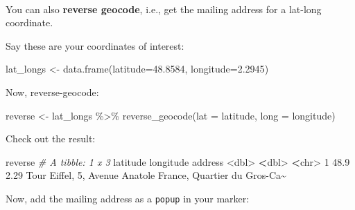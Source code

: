 \documentclass[
]{book}
\newenvironment{Shaded}{\begin{snugshade}}{\end{snugshade}}
\newcommand{\AttributeTok}[1]{\textcolor[rgb]{0.77,0.63,0.00}{#1}}
\newcommand{\CommentTok}[1]{\textcolor[rgb]{0.56,0.35,0.01}{\textit{#1}}}
\newcommand{\DecValTok}[1]{\textcolor[rgb]{0.00,0.00,0.81}{#1}}
\newcommand{\ErrorTok}[1]{\textcolor[rgb]{0.64,0.00,0.00}{\textbf{#1}}}
\newcommand{\FloatTok}[1]{\textcolor[rgb]{0.00,0.00,0.81}{#1}}
\newcommand{\FunctionTok}[1]{\textcolor[rgb]{0.00,0.00,0.00}{#1}}
\newcommand{\NormalTok}[1]{#1}
\newcommand{\OtherTok}[1]{\textcolor[rgb]{0.56,0.35,0.01}{#1}}
\newcommand{\SpecialCharTok}[1]{\textcolor[rgb]{0.00,0.00,0.00}{#1}}
\newcommand{\StringTok}[1]{\textcolor[rgb]{0.31,0.60,0.02}{#1}}
\begin{document}
~

You can also \textbf{reverse geocode}, i.e., get the mailing address for a lat-long coordinate.

Say these are your coordinates of interest:

\begin{Shaded}
\begin{Highlighting}[]
\NormalTok{lat\_longs }\OtherTok{\textless{}{-}} \FunctionTok{data.frame}\NormalTok{(}\AttributeTok{latitude=}\FloatTok{48.8584}\NormalTok{, }
                        \AttributeTok{longitude=}\FloatTok{2.2945}\NormalTok{)}
\end{Highlighting}
\end{Shaded}

Now, reverse-geocode:

\begin{Shaded}
\begin{Highlighting}[]
\NormalTok{reverse }\OtherTok{\textless{}{-}}\NormalTok{ lat\_longs }\SpecialCharTok{\%\textgreater{}\%}
    \FunctionTok{reverse\_geocode}\NormalTok{(}\AttributeTok{lat =}\NormalTok{ latitude, }
                    \AttributeTok{long =}\NormalTok{ longitude)}
\end{Highlighting}
\end{Shaded}

Check out the result:

\begin{Shaded}
\begin{Highlighting}[]
\NormalTok{reverse}
\CommentTok{\# A tibble: 1 x 3}
\NormalTok{  latitude longitude address                                                    }
     \SpecialCharTok{\textless{}}\NormalTok{dbl}\SpecialCharTok{\textgreater{}}     \ErrorTok{\textless{}}\NormalTok{dbl}\SpecialCharTok{\textgreater{}} \ErrorTok{\textless{}}\NormalTok{chr}\SpecialCharTok{\textgreater{}}                                                      
\DecValTok{1}     \FloatTok{48.9}      \FloatTok{2.29}\NormalTok{ Tour Eiffel, }\DecValTok{5}\NormalTok{, Avenue Anatole France, Quartier du Gros}\SpecialCharTok{{-}}\NormalTok{Ca}\SpecialCharTok{\textasciitilde{}}
\end{Highlighting}
\end{Shaded}

Now, add the mailing address as a \texttt{popup} in your marker:

\begin{Shaded}
\end{Shaded}
\end{document}
